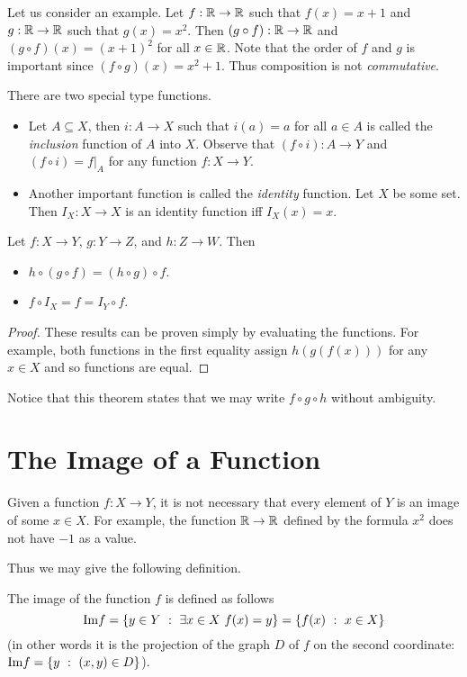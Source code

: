 Let us consider an example. Let $f : \mathbb{R} \to \mathbb{R}$ such that $f(x) = x + 1$ and
$g : \mathbb{R} \to \mathbb{R}$ such that $g(x) = x^2$. Then $(g \circ f) : \mathbb{R} \to \mathbb{R}$ and
$(g \circ f)(x) = (x + 1)^2$ for all $x \in \mathbb{R}$. Note that the order of $f$ and
$g$ is important since $(f \circ g)(x) = x^2 + 1$. Thus composition is not
\emph{commutative}.

There are two special type functions.
\begin{itemize}
  \item Let $A \subseteq X$, then $i : A \to X$ such that $i(a) = a$ for all
    $a \in A$ is called the \emph{inclusion} function of $A$ into $X$. Observe
    that $(f \circ i) : A \to Y$ and $(f \circ i) = f|_A$
    for any function $f : X \to Y$.
  \item Another important function is called the \emph{identity} function.
    Let $X$ be some set. Then $I_X : X \to X$ is an identity function iff
    $I_X(x) = x$.
\end{itemize}

\begin{theorem}
  Let $f : X \to Y$, $g : Y \to Z$, and $h : Z \to W$. Then
  \begin{itemize}
    \item $h \circ (g \circ f) = (h \circ g) \circ f$.
    \item $f \circ I_X = f = I_Y \circ f$.
  \end{itemize}
\end{theorem}
\begin{proof}
  These results can be proven simply by evaluating the functions. For example,
  both functions in the first equality assign $h(g(f(x)))$ for any $x \in X$
  and so functions are equal.
\end{proof}
Notice that this theorem states that we may write $f \circ g \circ h$ without
ambiguity.

\section{The Image of a Function}
Given a function $f : X \to Y$, it is not necessary that every element of $Y$
is an image of some $x \in X$. For example, the function $\mathbb{R} \to \mathbb{R}$ defined by
the formula $x^2$ does not have $-1$ as a value.

Thus we may give the following definition.
\begin{definition}
  The image of the function $f$ is defined as follows
  $$\Im f = \set[\exists x \in X\ f(x) = y]{y \in Y}
  = \set[x \in X]{f(x)}$$ (in other
  words it is the projection of the graph $D$ of $f$ on the second coordinate:
  $\Im f = \set[(x, y) \in D]{y}$).
\end{definition}

